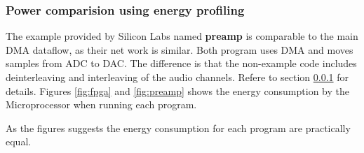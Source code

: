\subsubsection{Power comparision using energy profiling}

The example provided by Silicon Labs named {\bf preamp} is comparable to the main
DMA dataflow, as their net work is similar. Both program uses DMA and moves samples 
from ADC to DAC. The difference is that the non-example code includes deinterleaving
and interleaving of the audio channels. Refere to section \ref{} for details. Figures \ref{fig:fpga} and \ref{fig:preamp}
shows the energy consumption by the Microprocessor when running each program.





As the figures suggests the energy consumption for each program are practically equal.
